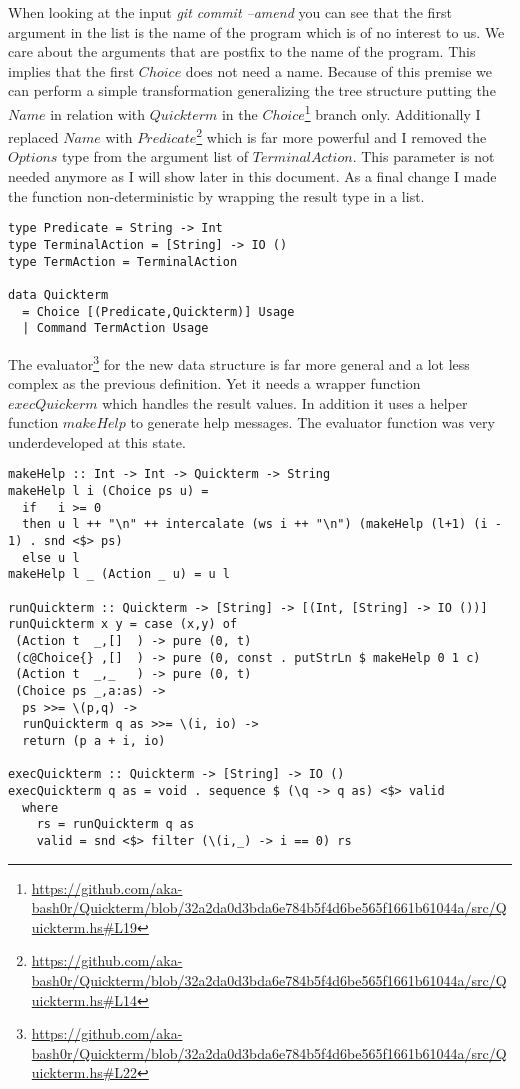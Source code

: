 \documentclass[a4paper]{article}
\begin{document}
When looking at the input \textit{git commit --amend} you can see that the first argument in the list is the name of the program which is of no interest to us. We care about the arguments that are postfix to the name of the program. This implies that the first $Choice$ does not need a name. Because of this premise we can perform a simple transformation generalizing the tree structure putting the $Name$ in relation with $Quickterm$ in the $Choice$\footnote{\url{https://github.com/aka-bash0r/Quickterm/blob/32a2da0d3bda6e784b5f4d6be565f1661b61044a/src/Quickterm.hs\#L19}} branch only. Additionally I replaced $Name$ with $Predicate$\footnote{\url{https://github.com/aka-bash0r/Quickterm/blob/32a2da0d3bda6e784b5f4d6be565f1661b61044a/src/Quickterm.hs\#L14}} which is far more powerful and I removed the $Options$ type from the argument list of $TerminalAction$. This parameter is not needed anymore as I will show later in this document. As a final change I made the function non-deterministic by wrapping the result type in a list.

\begin{lstlisting}
type Predicate = String -> Int
type TerminalAction = [String] -> IO ()
type TermAction = TerminalAction

data Quickterm
  = Choice [(Predicate,Quickterm)] Usage
  | Command TermAction Usage
\end{lstlisting}

The evaluator\footnote{\url{https://github.com/aka-bash0r/Quickterm/blob/32a2da0d3bda6e784b5f4d6be565f1661b61044a/src/Quickterm.hs\#L22}} for the new data structure is far more general and a lot less complex as the previous definition. Yet it needs a wrapper function $execQuickerm$ which handles the result values. In addition it uses a helper function $makeHelp$ to generate help messages. The evaluator function was very underdeveloped at this state.

\begin{lstlisting}
makeHelp :: Int -> Int -> Quickterm -> String
makeHelp l i (Choice ps u) =
  if   i >= 0
  then u l ++ "\n" ++ intercalate (ws i ++ "\n") (makeHelp (l+1) (i - 1) . snd <$> ps)
  else u l
makeHelp l _ (Action _ u) = u l

runQuickterm :: Quickterm -> [String] -> [(Int, [String] -> IO ())]
runQuickterm x y = case (x,y) of
 (Action t  _,[]  ) -> pure (0, t)
 (c@Choice{} ,[]  ) -> pure (0, const . putStrLn $ makeHelp 0 1 c)
 (Action t  _,_   ) -> pure (0, t)
 (Choice ps _,a:as) ->
  ps >>= \(p,q) ->
  runQuickterm q as >>= \(i, io) ->
  return (p a + i, io)

execQuickterm :: Quickterm -> [String] -> IO ()
execQuickterm q as = void . sequence $ (\q -> q as) <$> valid
  where
    rs = runQuickterm q as
    valid = snd <$> filter (\(i,_) -> i == 0) rs
\end{lstlisting}
\end{document}
